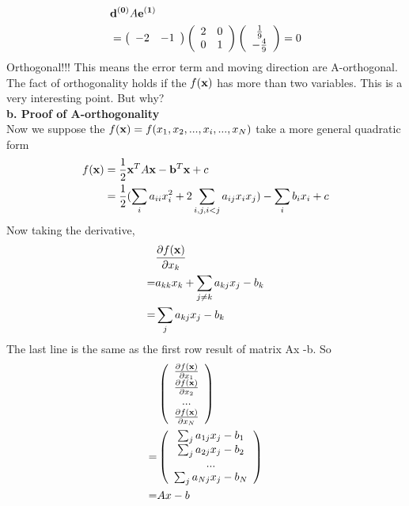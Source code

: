 \documentclass[a4paper]{article}
\begin{document}
\begin{align*}
	&{\bf d^{(0)}} A {\bf e^{(1)}} \\
	& = \left( 
	\begin{array}{c c}
	-2 & -1\\
	\end{array}
	\right)
	\left( 
	\begin{array}{c c}
	2 & 0 \\
	0 & 1 \\
	\end{array}
	\right)
	\left( 
	\begin{array}{c}
	\frac{1}{9} \\
	-\frac{4}{9} \\
	\end{array}
	\right)
	=0
\end{align*}
	Orthogonal!!! This means the error term and moving direction are A-orthogonal. The fact of orthogonality holds if the $f({\bf x})$ has more than two variables. This is a very interesting point. But why?\\
{\bf b. Proof of A-orthogonality}\\
Now we suppose the $f({\bf x}) = f(x_1, x_2, ... , x_i, ..., x_N )$ take a more general quadratic form\\
\begin{align*}
	f({\bf x}) & =	\frac{1}{2} {\bf x}^T A {\bf x} - {\bf b}^T {\bf x} + c \\
			   & =	\frac{1}{2} ( \sum_i a_{ii} x_i^2 + 2\sum_{i, j, i < j}  a_{ij} x_i x_j ) - \sum_i b_i x_i + c \\     
\end{align*}
Now taking the derivative,
\begin{align*}
	& \frac{\partial f({\bf x} )}{\partial x_k} \\
  = & a_{kk} x_k + \sum_{j \neq k} a_{kj} x_j  - b_k\\
  = & \sum_j a_{kj} x_j - b_k\\ 	
\end{align*}
The last line is the same as the first row result of matrix Ax -b. So 
\begin{align*}
	& \left( 
	\begin{array}{c}
	\frac{\partial f({\bf x})}{\partial x_1} \\
	\frac{\partial f({\bf x})}{\partial x_2} \\
	...\\
	\frac{\partial f({\bf x})}{\partial x_N} \\
	\end{array}
	\right) \\
	 = & \left( 
	\begin{array}{c}
     \sum_j a_{1j} x_j - b_1\\ 	
     \sum_j a_{2j} x_j - b_2\\ 	
     ...\\ 	
     \sum_j a_{Nj} x_j - b_N\\ 	
	\end{array}
	\right) \\
	 = & Ax-b
\end{align*}
\end{document}
